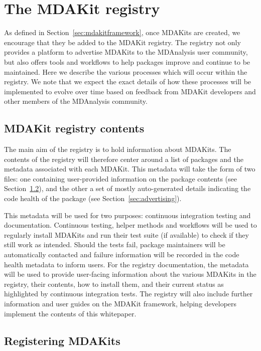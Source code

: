 \documentclass[9pt,whitepaper]{livecoms}
\begin{document}
\section{The MDAKit registry}
\label{sec:registry}

As defined in Section~\ref{sec:mdakitframework}, once MDAKits are created, we encourage that they be added to the MDAKit registry. The registry not only provides a platform to advertise MDAKits to the MDAnalysis user community, but also offers tools and workflows to help packages improve and continue to be maintained. Here we describe the various processes which will occur within the registry. We note that we expect the exact details of how these processes will be implemented to evolve over time based on feedback from MDAKit developers and other members of the MDAnalysis community.
 
\subsection{MDAKit registry contents}
\label{sec:registrycontents}

The main aim of the registry is to hold information about MDAKits. The contents of the registry will therefore center around a list of packages and the metadata associated with each MDAKit. This metadata will take the form of two files: one containing user-provided information on the package contents (see Section~\ref{sec:registration}), and the other a set of mostly auto-generated details indicating the code health of the package (see Section~\ref{sec:advertising}). 

This metadata will be used for two purposes: continuous integration testing and documentation. Continuous testing, helper methods and workflows will be used to regularly install MDAKits and run their test suite (if available) to check if they still work as intended. Should the tests fail, package maintainers will be automatically contacted and failure information will be recorded in the code health metadata to inform users. For the registry documentation, the metadata will be used to provide user-facing information about the various MDAKits in the registry, their contents, how to install them, and their current status as highlighted by continuous integration tests. The registry will also include further information and user guides on the MDAKit framework, helping developers implement the contents of this whitepaper.

\subsection{Registering MDAKits}
\label{sec:registration}
\end{document}
